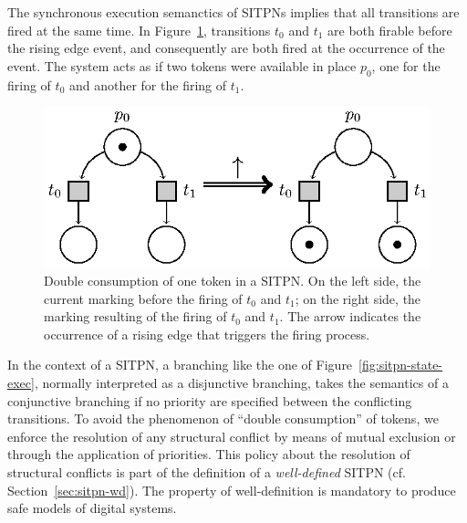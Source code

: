 

The synchronous execution semanctics of SITPNs implies that all
transitions are fired at the same time. In
Figure~\ref{fig:double-consum}, transitions $t_0$ and $t_1$ are both
firable before the rising edge event, and consequently are both fired
at the occurrence of the event. The system acts as if two tokens were
available in place $p_0$, one for the firing of $t_0$ and another for
the firing of $t_1$.

\begin{figure}[H]
  \centering
  \includegraphics[keepaspectratio=true, width=.6\textwidth]{double-consum.eps}
  \caption[Double consumption of token in a SITPN.]{Double consumption
    of one token in a SITPN. On the left side, the current marking
    before the firing of $t_0$ and $t_1$; on the right side, the
    marking resulting of the firing of $t_0$ and $t_1$. The arrow
    indicates the occurrence of a rising edge that triggers the firing
    process.}
  \label{fig:double-consum}
\end{figure}

In the context of a SITPN, a branching like the one of
Figure~\ref{fig:sitpn-state-exec}, normally interpreted as a
disjunctive branching, takes the semantics of a conjunctive branching
if no priority are specified between the conflicting transitions. To
avoid the phenomenon of ``double consumption'' of tokens, we enforce
the resolution of any structural conflict by means of mutual exclusion
or through the application of priorities. This policy about the
resolution of structural conflicts is part of the definition of a
\emph{well-defined} SITPN (cf. Section~\ref{sec:sitpn-wd}). The
property of well-definition is mandatory to produce safe models of
digital systems.


